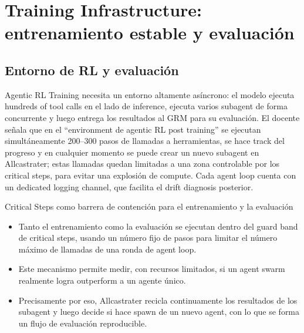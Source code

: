 \section{Training Infrastructure: entrenamiento estable y evaluación}

\subsection{Entorno de RL y evaluación}
Agentic RL Training necesita un entorno altamente asíncrono: el modelo ejecuta hundreds of tool calls en el lado de inference, ejecuta varios subagent de forma concurrente y luego entrega los resultados al GRM para su evaluación. El docente señala que en el ``environment de agentic RL post training'' se ejecutan simultáneamente 200--300 pasos de llamadas a herramientas, se hace track del progreso y en cualquier momento se puede crear un nuevo subagent en Allcastrater; estas llamadas quedan limitadas a una zona controlable por los critical steps, para evitar una explosión de compute. Cada agent loop cuenta con un dedicated logging channel, que facilita el drift diagnosis posterior.

\begin{knowledgebox}{Critical Steps como barrera de contención para el entrenamiento y la evaluación}
\begin{itemize}
    \item Tanto el entrenamiento como la evaluación se ejecutan dentro del guard band de critical steps, usando un número fijo de pasos para limitar el número máximo de llamadas de una ronda de agent loop.
    \item Este mecanismo permite medir, con recursos limitados, si un agent swarm realmente logra outperform a un agente único.
    \item Precisamente por eso, Allcastrater recicla continuamente los resultados de los subagent y luego decide si hace spawn de un nuevo agent, con lo que se forma un flujo de evaluación reproducible.
\end{itemize}
\end{knowledgebox}

